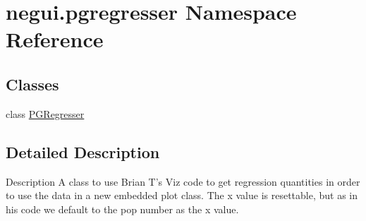 \hypertarget{namespacenegui_1_1pgregresser}{}\section{negui.\+pgregresser Namespace Reference}
\label{namespacenegui_1_1pgregresser}
\subsection*{Classes}
\begin{DoxyCompactItemize}
\item 
class \hyperlink{classnegui_1_1pgregresser_1_1PGRegresser}{P\+G\+Regresser}
\end{DoxyCompactItemize}


\subsection{Detailed Description}
\begin{DoxyVerb}Description
A class to use  Brian T's Viz code to get regression 
quantities in order to use the data in a new embedded 
plot class.  The x value is resettable, but as in his 
code we default to the pop number as the x value.
\end{DoxyVerb}
 